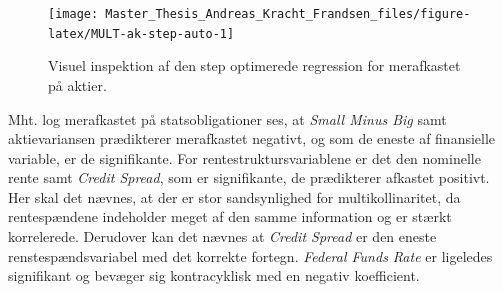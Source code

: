 \documentclass[
  a4paper,
  oneside]{memoir}
\begin{document}
\begin{figure}[H]

{\centering \texttt{[image: Master\_Thesis\_Andreas\_Kracht\_Frandsen\_files/figure-latex/MULT-ak-step-auto-1]} 

}

\caption{Visuel inspektion af den step optimerede regression for merafkastet på aktier.}\label{fig:MULT-ak-step-auto}
\end{figure}

Mht. log merafkastet på statsobligationer ses, at \emph{Small Minus Big} samt aktievariansen prædikterer merafkastet negativt, og som de eneste af finansielle variable, er de signifikante. For rentestruktursvariablene er det den nominelle rente samt \emph{Credit Spread}, som er signifikante, de prædikterer afkastet positivt. Her skal det nævnes, at der er stor sandsynlighed for multikollinaritet, da rentespændene indeholder meget af den samme information og er stærkt korrelerede. Derudover kan det nævnes at \emph{Credit Spread} er den eneste renstespændsvariabel med det korrekte fortegn. \emph{Federal Funds Rate} er ligeledes signifikant og bevæger sig kontracyklisk med en negativ koefficient.
\end{document}
